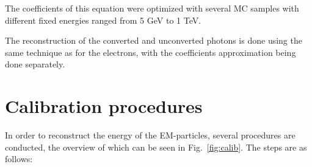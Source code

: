 The coefficients of this equation were optimized with several MC samples with different fixed energies ranged from 5 GeV to 1 TeV.

The reconstruction of the converted and unconverted photons is done using the same technique as for the electrons, with the coefficients approximation being done separately.

\section{Calibration procedures}

\begin{figure}
\end{figure}

In order to reconstruct the energy of the EM-particles, several procedures are conducted, the overview of which can be seen in Fig.~\ref{fig:calib}. The steps are as follows:

